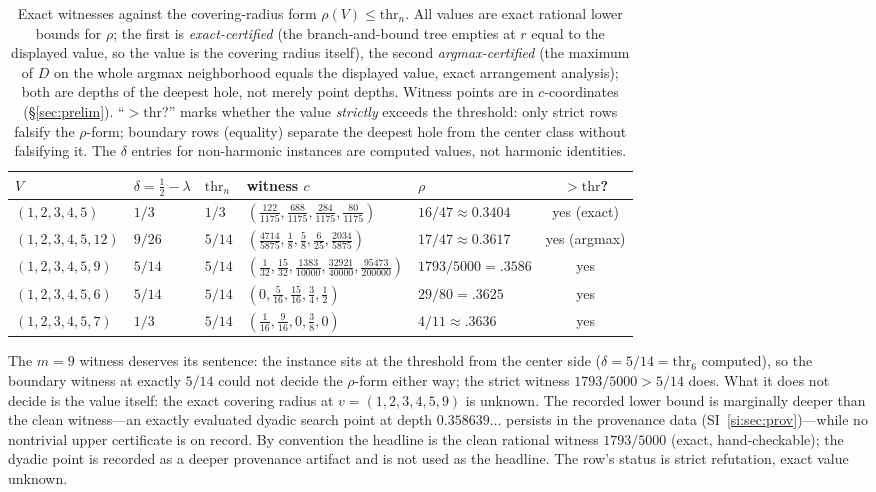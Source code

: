 \begin{table}[htbp]
\centering
\footnotesize
\caption{Exact witnesses against the covering-radius form
$\rho(V)\le\mathrm{thr}_n$. All values are exact rational lower bounds
for $\rho$; the first is \emph{exact-certified} (the branch-and-bound
tree empties at $r$ equal to the displayed value, so the value is the
covering radius itself), the second \emph{argmax-certified} (the
maximum of $D$ on the whole argmax neighborhood equals the displayed
value, exact arrangement analysis); both are depths of the deepest
hole, not merely point depths. Witness points are in $c$-coordinates
(\S\ref{sec:prelim}). ``$>\mathrm{thr}$?'' marks whether the value
\emph{strictly} exceeds the threshold: only strict rows falsify the
$\rho$-form; boundary rows (equality) separate the deepest hole from
the center class without falsifying it. The $\delta$ entries for
non-harmonic instances are computed values, not harmonic identities.}
\label{tab:refute}
\begin{tabularx}{\textwidth}{@{} l l l >{\raggedright\arraybackslash}X l c @{}}
\toprule
$V$ & $\delta=\tfrac12-\lambda$ & $\mathrm{thr}_n$ & witness $c$ &
$\rho$ & $>\mathrm{thr}$? \\
\midrule
$(1,2,3,4,5)$ & $1/3$ & $1/3$ &
$(\tfrac{122}{1175},\tfrac{688}{1175},\tfrac{284}{1175},
\tfrac{80}{1175})$ &
$16/47\approx0.3404$ & yes (exact) \\
$(1,2,3,4,5,12)$ & $9/26$ & $5/14$ &
$(\tfrac{4714}{5875},\tfrac18,\tfrac58,\tfrac6{25},
\tfrac{2034}{5875})$ &
$17/47\approx0.3617$ & yes (argmax) \\
$(1,2,3,4,5,9)$ & $5/14$ & $5/14$ &
$(\tfrac1{32},\tfrac{15}{32},\tfrac{1383}{10000},
\tfrac{32921}{40000},\tfrac{95473}{200000})$ &
$1793/5000=.3586$ & yes \\
$(1,2,3,4,5,6)$ & $5/14$ & $5/14$ &
$(0,\tfrac5{16},\tfrac{15}{16},\tfrac34,\tfrac12)$ & $29/80=.3625$ &
yes \\
$(1,2,3,4,5,7)$ & $1/3$ & $5/14$ &
$(\tfrac1{16},\tfrac9{16},0,\tfrac38,0)$ & $4/11{\approx}.3636$ & yes
\\
\bottomrule
\end{tabularx}
\end{table}

The $m=9$ witness deserves its sentence: the instance sits at the
threshold from the center side ($\delta=5/14=\mathrm{thr}_6$ computed),
so the boundary witness at exactly $5/14$ could not decide the
$\rho$-form either way; the strict witness $1793/5000>5/14$ does. What
it does not decide is the value itself: the exact covering radius at
$v=(1,2,3,4,5,9)$ is unknown. The recorded lower bound is marginally
deeper than the clean witness---an exactly evaluated dyadic search
point at depth $0.358639\ldots$ persists in the provenance data
(SI~\ref{si:sec:prov})---while no nontrivial upper certificate is
on record. By convention the headline is the clean rational witness
$1793/5000$ (exact, hand-checkable); the dyadic point is recorded as a
deeper provenance artifact and is not used as the headline. The row's
status is strict refutation, exact value unknown.

